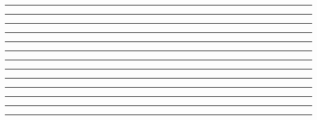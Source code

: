 \documentclass{article}
\begin{document}
\newpage
\noindent{}\rule{1cm}{0.025cm}

\newpage
\noindent{}\rule{1cm}{0.025cm}

\newpage
\noindent{}\rule{1cm}{0.025cm}

\newpage
\noindent{}\rule{1cm}{0.025cm}

\newpage
\noindent{}\rule{1cm}{0.025cm}

\newpage
\noindent{}\rule{1cm}{0.025cm}

\newpage
\noindent{}\rule{1cm}{0.025cm}

\newpage
\noindent{}\rule{1cm}{0.025cm}

\newpage
\noindent{}\rule{1cm}{0.025cm}

\newpage
\noindent{}\rule{1cm}{0.025cm}

\newpage
\noindent{}\rule{1cm}{0.025cm}

\newpage
\noindent{}\rule{1cm}{0.025cm}

\newpage
\noindent{}\rule{1cm}{0.025cm}
\end{document}
